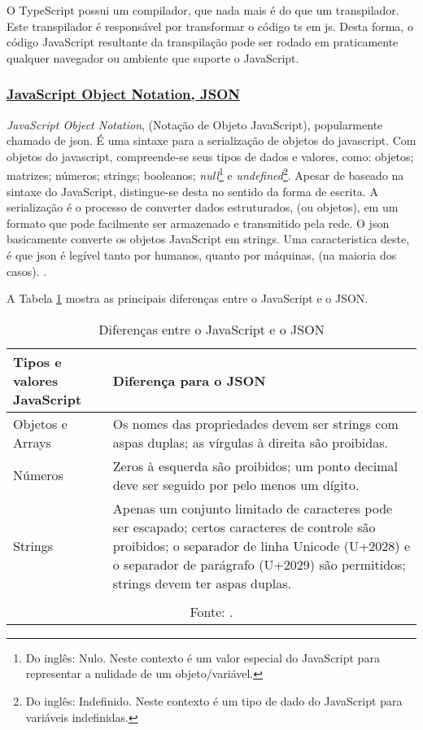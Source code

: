 O TypeScript possui um compilador, que nada mais é do que um
transpilador. Este transpilador é responsável por transformar o
código
\acrshort{ts} em
\acrshort{js}.
Desta forma, o código JavaScript resultante da
transpilação pode ser rodado em praticamente qualquer
navegador ou ambiente que suporte o JavaScript.

\subsubsection{\underline{JavaScript Object Notation, JSON}}

\textit{JavaScript Object Notation}, (Notação de Objeto JavaScript),
popularmente chamado de \acrshort{json}. É uma sintaxe para a serialização de
objetos do javascript. Com objetos do javascript, compreende-se seus tipos
de dados e valores, como: objetos; matrizes; números; strings; booleanos;
\textit{null}\footnote{Do inglês: Nulo. Neste contexto é um valor especial do JavaScript para
    representar a nulidade de um objeto/variável.
}
e
\textit{undefined}\footnote{Do inglês: Indefinido. Neste contexto é um tipo de dado do JavaScript
    para variáveis indefinidas.
}.
Apesar de baseado na sintaxe do JavaScript, distingue-se desta
no sentido da forma de escrita. A serialização é o processo
de converter dados estruturados, (ou objetos), em um formato que pode
facilmente ser armazenado e transmitido pela rede. O \acrshort{json}
basicamente converte os objetos JavaScript em strings. Uma caracteristica deste,
é que \acrshort{json} é legível tanto por humanos, quanto por máquinas,
(na maioria dos casos).
\cite{mdn-json}.

A
Tabela \ref{tbl:json-descs}
mostra as principais
diferenças entre o JavaScript e o JSON.

\begin{table}[H]
    \centering
    \caption{Diferenças entre o JavaScript e o JSON}
    \label{tbl:json-descs}
    \renewcommand{\arraystretch}{1.5}
    \begin{tabular}{p{5.6000cm} p{10.4000cm}}
        \hline
        \textbf{Tipos e valores JavaScript} & \textbf{Diferença para o JSON} \\
        \hline
        Objetos e Arrays & Os nomes das propriedades devem ser strings com aspas duplas; as vírgulas à direita são proibidas. \\
		Números & Zeros à esquerda são proibidos; um ponto decimal deve ser seguido por pelo menos um dígito. \\
		Strings & Apenas um conjunto limitado de caracteres pode ser escapado; certos caracteres de controle são proibidos; o separador de linha Unicode (U+2028) e o separador de parágrafo (U+2029) são permitidos; strings devem ter aspas duplas.
             \\
        \hline
        \\\multicolumn{2}{c}{\fontsize{10pt}{12pt}Fonte: \cite{mdn-json}.}
    \end{tabular}
\end{table}

